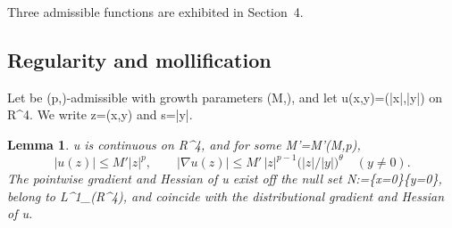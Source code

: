 \documentclass[10pt,reqno]{amsart}
\def\({}\def\){}%
\def\frac#1#2{#1/#2}%
\newtheorem{lemma}[theorem]{Lemma}
\theoremstyle{definition}
\theoremstyle{remark}
\begin{document}
Three admissible functions are exhibited in Section~4.

\subsection{Regularity and mollification}\label{subsec:mollification}

Let \(\varphi\) be \((p,\Lambda)\)-admissible with growth parameters \((M,\theta)\), and let \(u(x,y)=\varphi(|x|,|y|)\) on \(\mathbb R^4\). We write \(z=(x,y)\) and \(s=|y|\).

\begin{lemma}\label{lem:2-5}
\(u\) is continuous on \(\mathbb R^4\), and for some \(M'=M'(M,p)\), \[|u(z)|\le M'|z|^p,\qquad
|\nabla u(z)|\le M'\,|z|^{p-1}\Big(\frac{|z|}{|y|}\Big)^{\theta}\quad(y\ne0).
\tag{2.4}\] The pointwise gradient and Hessian of \(u\) exist off the null set \(\mathcal N:=\{x=0\}\cup\{y=0\}\), belong to \(L^1_{}(\mathbb R^4)\), and coincide with the distributional gradient and Hessian of \(u\).
\end{lemma}
\end{document}
